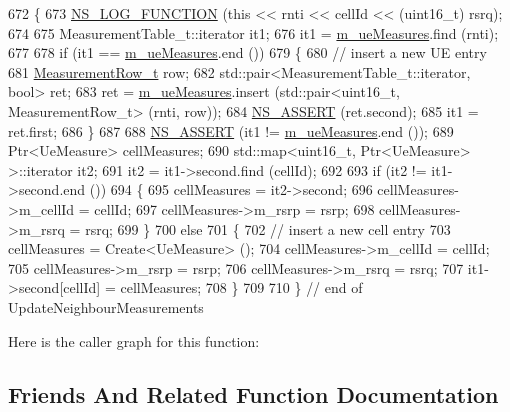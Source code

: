 \begin{DoxyCode}
672 \{
673   \hyperlink{log-macros-disabled_8h_a90b90d5bad1f39cb1b64923ea94c0761}{NS\_LOG\_FUNCTION} (\textcolor{keyword}{this} << rnti << cellId << (uint16\_t) rsrq);
674 
675   MeasurementTable\_t::iterator it1;
676   it1 = \hyperlink{classns3_1_1LteFfrDistributedAlgorithm_a7c74c81039a56db450fc726ab9d26d2c}{m\_ueMeasures}.find (rnti);
677 
678   \textcolor{keywordflow}{if} (it1 == \hyperlink{classns3_1_1LteFfrDistributedAlgorithm_a7c74c81039a56db450fc726ab9d26d2c}{m\_ueMeasures}.end ())
679     \{
680       \textcolor{comment}{// insert a new UE entry}
681       \hyperlink{classns3_1_1LteFfrDistributedAlgorithm_a006ba77bb5533b9fc25640ed35f78d44}{MeasurementRow\_t} row;
682       std::pair<MeasurementTable\_t::iterator, bool> ret;
683       ret = \hyperlink{classns3_1_1LteFfrDistributedAlgorithm_a7c74c81039a56db450fc726ab9d26d2c}{m\_ueMeasures}.insert (std::pair<uint16\_t, MeasurementRow\_t> (rnti, row));
684       \hyperlink{assert_8h_a6dccdb0de9b252f60088ce281c49d052}{NS\_ASSERT} (ret.second);
685       it1 = ret.first;
686     \}
687 
688   \hyperlink{assert_8h_a6dccdb0de9b252f60088ce281c49d052}{NS\_ASSERT} (it1 != \hyperlink{classns3_1_1LteFfrDistributedAlgorithm_a7c74c81039a56db450fc726ab9d26d2c}{m\_ueMeasures}.end ());
689   Ptr<UeMeasure> cellMeasures;
690   std::map<uint16\_t, Ptr<UeMeasure> >::iterator it2;
691   it2 = it1->second.find (cellId);
692 
693   \textcolor{keywordflow}{if} (it2 != it1->second.end ())
694     \{
695       cellMeasures = it2->second;
696       cellMeasures->m\_cellId = cellId;
697       cellMeasures->m\_rsrp = rsrp;
698       cellMeasures->m\_rsrq = rsrq;
699     \}
700   \textcolor{keywordflow}{else}
701     \{
702       \textcolor{comment}{// insert a new cell entry}
703       cellMeasures = Create<UeMeasure> ();
704       cellMeasures->m\_cellId = cellId;
705       cellMeasures->m\_rsrp = rsrp;
706       cellMeasures->m\_rsrq = rsrq;
707       it1->second[cellId] = cellMeasures;
708     \}
709 
710 \} \textcolor{comment}{// end of UpdateNeighbourMeasurements}
\end{DoxyCode}


Here is the caller graph for this function\+:




\subsection{Friends And Related Function Documentation}
